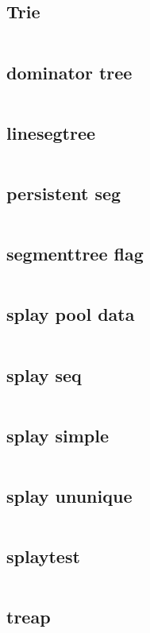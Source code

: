 \subsection{Trie}
  \inputminted{cpp}{../code/data_structure/Trie.cpp}
\subsection{dominator tree}
  \inputminted{cpp}{../code/data_structure/dominator_tree.cpp}
\subsection{linesegtree}
  \inputminted{cpp}{../code/data_structure/linesegtree.cpp}
\subsection{persistent seg}
  \inputminted{cpp}{../code/data_structure/persistent_seg.cpp}
\subsection{segmenttree flag}
  \inputminted{cpp}{../code/data_structure/segmenttree_flag.cpp}
\subsection{splay pool data}
  \inputminted{cpp}{../code/data_structure/splay_pool_data.cpp}
\subsection{splay seq}
  \inputminted{cpp}{../code/data_structure/splay_seq.cpp}
\subsection{splay simple}
  \inputminted{cpp}{../code/data_structure/splay_simple.cpp}
\subsection{splay ununique}
  \inputminted{cpp}{../code/data_structure/splay_ununique.cpp}
\subsection{splaytest}
  \inputminted{cpp}{../code/data_structure/splaytest.cpp}
\subsection{treap}
  \inputminted{cpp}{../code/data_structure/treap.cpp}
